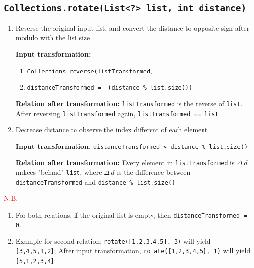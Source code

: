 \documentclass[12pt, a4paper]{article}
\begin{document}
\subsection{\texttt{Collections.rotate(List<?> list, int distance)}}
\begin{enumerate}
  \item Reverse the original input list, and convert the distance to opposite sign after modulo with
  the list size
  \par\quad\textbf{Input transformation:}
  \begin{enumerate}
    \item \texttt{Collections.reverse(listTransformed)}
    \item \texttt{distanceTransformed = -(distance \% list.size())}
  \end{enumerate}
  \par\quad\textbf{Relation after transformation:} \texttt{listTransformed} is the reverse of \texttt{list}.
  After reversing \texttt{listTransformed} again, \texttt{listTransformed == list}

  \item Decrease distance to observe the index different of each element
  \par\quad\textbf{Input transformation:} \texttt{distanceTransformed < distance \% list.size()}
  \par\quad\textbf{Relation after transformation:} Every element in \texttt{listTransformed} is $\Delta\,d$
  indices "behind" \texttt{list}, where $\Delta\,d$ is the difference between
  \texttt{distanceTransformed} and \texttt{distance \% list.size()}
\end{enumerate}

\noindent\textcolor{red}{N.B.}
\begin{enumerate}
  \item For both relations, if the original list is empty, then \texttt{distanceTransformed = 0}.
  \item Example for second relation: \texttt{rotate([1,2,3,4,5], 3)} will yield
  \texttt{[3,4,5,1,2]}; After input transformation, \texttt{rotate([1,2,3,4,5], 1)} will yield
  \texttt{[5,1,2,3,4]}.
\end{enumerate}
\end{document}
